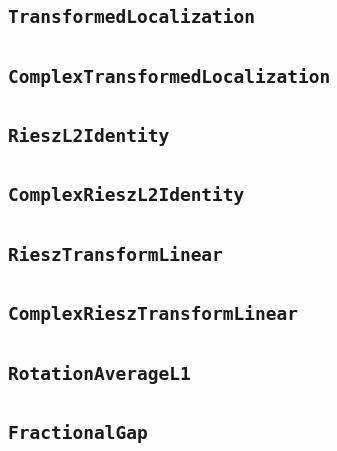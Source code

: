 \documentclass[11pt]{amsart}
\theoremstyle{definition}
\begin{document}
\subsection{\texorpdfstring{\texttt{TransformedLocalization}}{TransformedLocalization}}\label{node:TransformedLocalization}


\subsection{\texorpdfstring{\texttt{ComplexTransformedLocalization}}{ComplexTransformedLocalization}}\label{node:ComplexTransformedLocalization}


\subsection{\texorpdfstring{\texttt{RieszL2Identity}}{RieszL2Identity}}\label{node:RieszL2Identity}


\subsection{\texorpdfstring{\texttt{ComplexRieszL2Identity}}{ComplexRieszL2Identity}}\label{node:ComplexRieszL2Identity}


\subsection{\texorpdfstring{\texttt{RieszTransformLinear}}{RieszTransformLinear}}\label{node:RieszTransformLinear}


\subsection{\texorpdfstring{\texttt{ComplexRieszTransformLinear}}{ComplexRieszTransformLinear}}\label{node:ComplexRieszTransformLinear}


\subsection{\texorpdfstring{\texttt{RotationAverageL1}}{RotationAverageL1}}\label{node:RotationAverageL1}


\subsection{\texorpdfstring{\texttt{FractionalGap}}{FractionalGap}}\label{node:FractionalGap}

\end{document}
